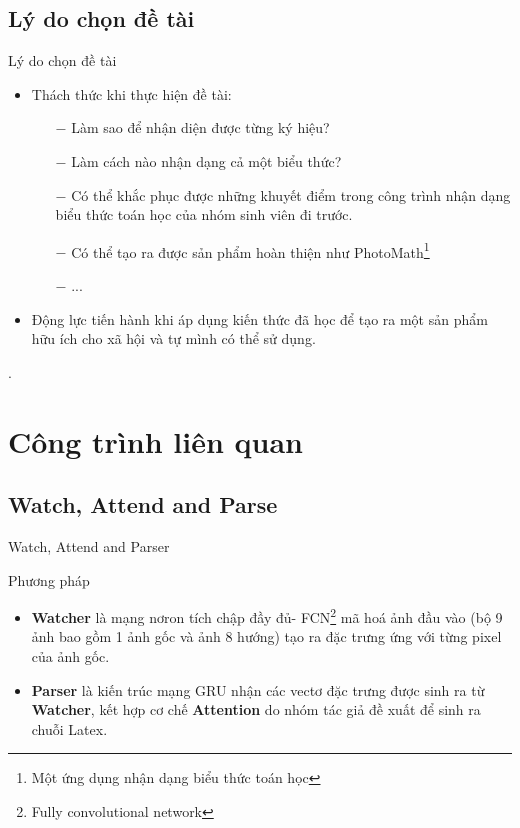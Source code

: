 \documentclass{beamer}
\begin{document}
	\subsection{Lý do chọn đề tài}
	\begin{frame}{Lý do chọn đề tài}
		\begin{itemize}
			\item Thách thức khi thực hiện đề tài:
			\begin{itemize}
				\item[$-$] Làm sao để nhận diện được từng ký hiệu?
				\item[$-$] Làm cách nào nhận dạng cả một biểu thức?
				\item[$-$] Có thể khắc phục được những khuyết điểm trong công trình nhận dạng biểu thức toán học của nhóm sinh viên đi trước.
				\item [$-$]Có thể tạo ra được sản phẩm hoàn thiện như PhotoMath\footnote{Một ứng dụng nhận dạng biểu thức toán học} 
				\item[$-$] ...
			\end{itemize}
			\item Động lực tiến hành khi áp dụng kiến thức đã học để tạo ra một sản phẩm hữu ích cho xã hội và tự mình có thể sử dụng.
		\end{itemize}
		.	\end{frame}
	
	\section{Công trình liên quan}
	\subsection{Watch, Attend and Parse}
	
	\begin{frame}{Watch, Attend and Parser}
		\begin{block}{Phương pháp}
			\begin{itemize}
				\item \textbf{Watcher} là mạng nơron tích chập đầy đủ- FCN\footnote{Fully convolutional network} mã hoá ảnh đầu vào (bộ 9 ảnh bao gồm 1 ảnh gốc và ảnh 8 hướng) tạo ra đặc trưng ứng với từng pixel của ảnh gốc.
				\item \textbf{Parser} là kiến trúc mạng GRU nhận các vectơ đặc trưng được sinh ra từ \textbf{Watcher}, kết hợp cơ chế \textbf{Attention} do nhóm tác giả đề xuất để sinh ra chuỗi Latex.
			\end{itemize}
		\end{block}
	\end{frame}
	
\end{document}
